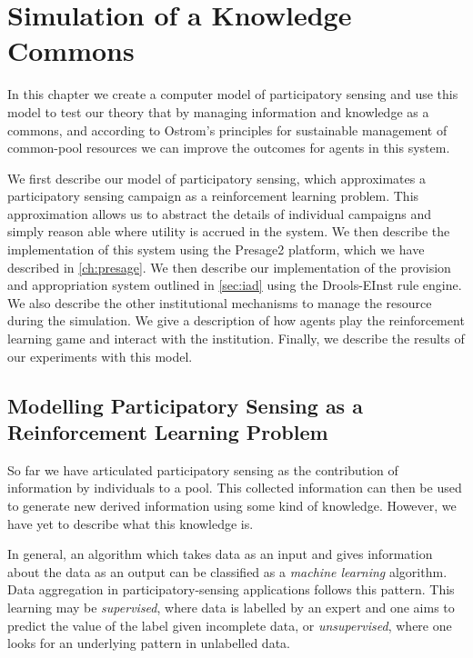\acresetall
\chapter{Simulation of a Knowledge Commons}

In this chapter we create a computer model of participatory sensing and use
this model to test our theory that by managing information and knowledge as a
commons, and according to Ostrom's principles for sustainable management of
common-pool resources we can improve the outcomes for agents in this system.

We first describe our model of participatory sensing, which approximates a
participatory sensing campaign as a reinforcement learning problem. This
approximation allows us to abstract the details of individual campaigns and
simply reason able where utility is accrued in the system. We then describe
the implementation of this system using the Presage2 platform, which we have
described in \autoref{ch:presage}. We then describe our implementation of the
provision and appropriation system outlined in \autoref{sec:iad} using the
Drools-EInst rule engine. We also describe the other institutional mechanisms
to manage the resource during the simulation. We give a description of how
agents play the reinforcement learning game and interact with the institution.
Finally, we describe the results of our experiments with this model.

\section{Modelling Participatory Sensing as a Reinforcement Learning Problem}

So far we have articulated participatory sensing as the contribution of
information by individuals to a pool. This collected information can then be
used to generate new derived information using some kind of knowledge.
However, we have yet to describe what this knowledge is.

In general, an algorithm which takes data as an input and gives information
about the data as an output can be classified as a \emph{machine learning}
algorithm. Data aggregation in participatory-sensing applications follows this
pattern. This learning may be \emph{supervised}, where data is labelled by an
expert and one aims to predict the value of the label given incomplete data,
or \emph{unsupervised}, where one looks for an underlying pattern in
unlabelled data.

